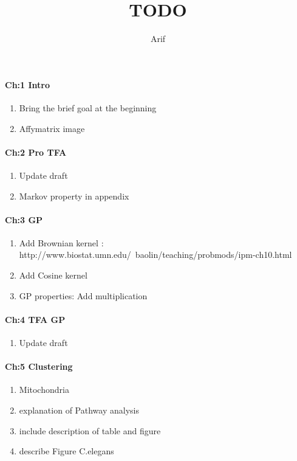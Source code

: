 \documentclass[a4paper,10pt]{article}
\title{TODO}
\author{Arif}
\begin{document}
\maketitle


\paragraph{Ch:1 Intro}
\begin{enumerate}
 \item Bring the brief goal at the beginning 
 \item Affymatrix image
\end{enumerate}

\paragraph{Ch:2 Pro TFA}
\begin{enumerate}
 \item Update draft
 \item Markov property in appendix
\end{enumerate}

\paragraph{Ch:3 GP}
\begin{enumerate}
 \item Add Brownian kernel : http://www.biostat.umn.edu/~baolin/teaching/probmods/ipm-ch10.html
 \item Add Cosine kernel
 \item GP properties: Add multiplication
\end{enumerate}

\paragraph{Ch:4 TFA GP}
\begin{enumerate}
 \item Update draft
\end{enumerate}

\paragraph{Ch:5 Clustering}
\begin{enumerate}
 \item Mitochondria
 \item explanation of Pathway analysis
 \item include description of table and figure
 \item describe Figure C.elegans
\end{enumerate}
\end{document}
